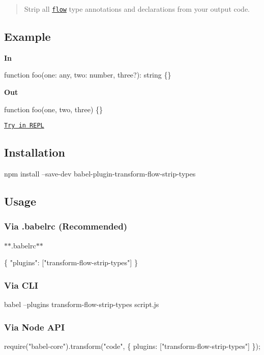 \begin{quote}
Strip all \href{http://flowtype.org}{\tt flow} type annotations and declarations from your output code. \end{quote}


\subsection*{Example}

{\bfseries In}


\begin{DoxyCode}
function foo(one: any, two: number, three?): string \{\}
\end{DoxyCode}


{\bfseries Out}


\begin{DoxyCode}
function foo(one, two, three) \{\}
\end{DoxyCode}


\href{http://babeljs.io/repl/#?babili=false&evaluate=true&lineWrap=false&presets=react&code=function%20foo(one%3A%20any%2C%20two%3A%20number%2C%20three%3F)%3A%20string%20%7B%7D&experimental=false&loose=false&spec=false&playground=false&stage=0}{\tt Try in R\+E\+PL}

\subsection*{Installation}


\begin{DoxyCode}
npm install --save-dev babel-plugin-transform-flow-strip-types
\end{DoxyCode}


\subsection*{Usage}

\subsubsection*{Via {\ttfamily .babelrc} (Recommended)}

$\ast$$\ast$.babelrc$\ast$$\ast$


\begin{DoxyCode}
\{
  "plugins": ["transform-flow-strip-types"]
\}
\end{DoxyCode}


\subsubsection*{Via C\+LI}


\begin{DoxyCode}
babel --plugins transform-flow-strip-types script.js
\end{DoxyCode}


\subsubsection*{Via Node A\+PI}


\begin{DoxyCode}
require("babel-core").transform("code", \{
  plugins: ["transform-flow-strip-types"]
\});
\end{DoxyCode}
 